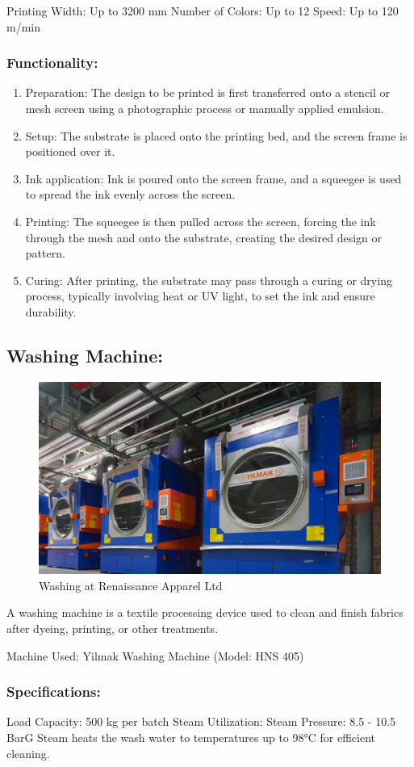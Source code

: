 Printing Width: Up to 3200 mm
Number of Colors: Up to 12
Speed: Up to 120 m/min


\subsubsection{Functionality:}

\begin{enumerate}
\item
  Preparation: The design to be printed is first transferred onto a
  stencil or mesh screen using a photographic process or manually
  applied emulsion.
\item
  Setup: The substrate is placed onto the printing bed, and the screen
  frame is positioned over it.
\item
  Ink application: Ink is poured onto the screen frame, and a squeegee
  is used to spread the ink evenly across the screen.
\item
  Printing: The squeegee is then pulled across the screen, forcing the
  ink through the mesh and onto the substrate, creating the desired
  design or pattern.
\item
  Curing: After printing, the substrate may pass through a curing or
  drying process, typically involving heat or UV light, to set the ink
  and ensure durability.
\end{enumerate}


\subsection{Washing Machine:}
\begin{figure}[h!]
  \centering
  \includegraphics[width=0.8\linewidth]{figs/washing.jpg}
  \caption{Washing at Renaissance Apparel Ltd}
  \label{fig:washing}
\end{figure}

A washing machine is a textile processing device used to clean and finish fabrics after dyeing, printing, or other treatments.

Machine Used: Yilmak Washing Machine (Model: HNS 405)

\subsubsection{Specifications:}
Load Capacity: 500 kg per batch
Steam Utilization:
Steam Pressure: 8.5 - 10.5 BarG
Steam heats the wash water to temperatures up to 98°C for efficient cleaning.
